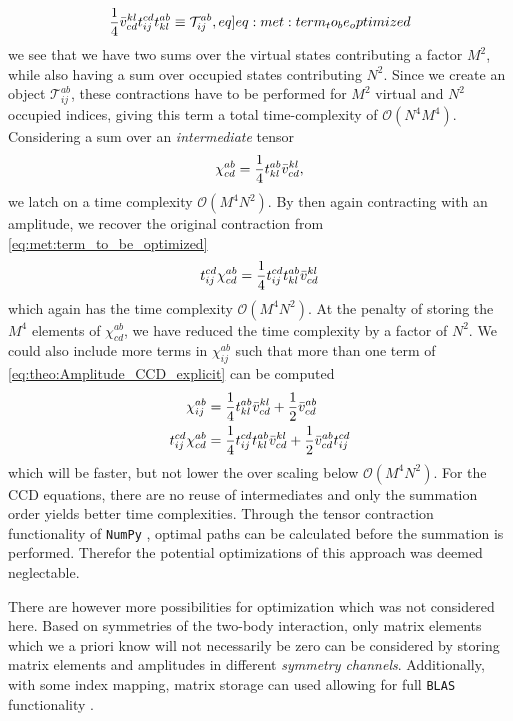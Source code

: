 \begin{align}
    \frac{1}{4}\elmASshort{kl}{cd}\amplitude{cd}{ij}\amplitude{ab}{kl} \equiv \mathcal{T}^{ab}_{ij}, \label[eq]{eq:met:term_to_be_optimized}
\end{align}
we see that we have two sums over the virtual states contributing a factor $M^2$, while also having a sum over occupied states contributing $N^2$. Since we create an object $\mathcal{T}^{ab}_{ij}$, these contractions have to be performed for $M^2$ virtual and $N^2$ occupied indices, giving this term a total time-complexity of $\mathcal{O}(N^4 M^4)$. Considering a sum over an \textit{intermediate} tensor 
\begin{align*}
    \chi^{ab}_{cd} = \frac{1}{4}t^{ab}_{kl}\bar{v}^{kl}_{cd},
\end{align*}
we latch on a time complexity $\mathcal{O}(M^4 N^2)$. By then again contracting with an amplitude, we recover the original contraction from \cref{eq:met:term_to_be_optimized}
\begin{align*}
    t^{cd}_{ij}\chi^{ab}_{cd} = \frac{1}{4} t^{cd}_{ij}t^{ab}_{kl} \bar{v}^{kl}_{cd}
\end{align*}
which again has the time complexity $\mathcal{O}(M^4 N^2)$. At the penalty of storing the $M^4$ elements of $\chi^{ab}_{cd}$, we have reduced the time complexity by a factor of $N^2$. We could also include more terms in $\chi^{ab}_{ij}$ such that more than one term of \cref{eq:theo:Amplitude_CCD_explicit} can be computed
\begin{align*}
    \chi^{ab}_{ij} &= \frac{1}{4}t^{ab}_{kl}\bar{v}^{kl}_{cd} + \frac{1}{2} \bar{v}^{ab}_{cd} \\
    t^{cd}_{ij}\chi^{ab}_{cd} &= \frac{1}{4} t^{cd}_{ij}t^{ab}_{kl} \bar{v}^{kl}_{cd} + \frac{1}{2}\bar{v}^{ab}_{cd}t^{cd}_{ij}
\end{align*}
which will be faster, but not lower the over scaling below $\mathcal{O}(M^4 N^2)$. For the CCD equations, there are no reuse of intermediates and only the summation order yields better time complexities. Through the tensor contraction functionality of \verb|NumPy| \citep{vanderwaltNumPyArrayStructure2011}, optimal paths can be calculated before the summation is performed. Therefor the potential optimizations of this approach was deemed neglectable. 

There are however more possibilities for optimization which was not considered here. Based on symmetries of the two-body interaction, only matrix elements which we a priori know will not necessarily be zero can be considered by storing matrix elements and amplitudes in different \textit{symmetry channels}. Additionally, with some index mapping, matrix storage can used allowing for full \verb|BLAS| functionality \citep{blackford2002updated}.    
